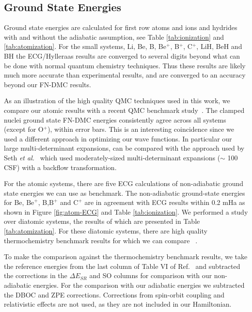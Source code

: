 \documentclass[pra,superscriptaddress,groupedaddress,twocolumn]{revtex4}
\begin{document}
\subsection{Ground State Energies}

Ground state energies are calculated for first row atoms and ions and hydrides with and without the adiabatic assumption, see Table \ref{tab:ionization} and \ref{tab:atomization}. For the small systems, Li, Be, B, Be$^+$, B$^+$, C$^+$, LiH, BeH and BH the ECG/Hylleraas results are converged to several digits beyond what can be done with normal quantum chemistry techniques. Thus these results are likely much more accurate than experimental results, and are converged to an accuracy beyond our FN-DMC results.

As an illustration of the high quality QMC techniques used in this work, we compare our atomic results with a recent QMC benchmark study~\cite{Seth_Bench}. The clamped nuclei ground state FN-DMC energies consistently agree across all systems (except for O$^{+}$), within error bars. This is an interesting coincidence since we used a different approach in optimizing our wave functions. In particular our large multi-determinant expansions, can be compared with the approach used by Seth {\it et al.}~\cite{Seth_Bench} which used moderately-sized multi-determinant expansions ($\sim$ 100 CSF) with a backflow transformation.   
 
For the atomic systems, there are five ECG calculations of non-adiabatic ground state energies we can use as benchmark. The non-adiabatic ground-state energies for Be, $\text{Be}^+$, B,$\text{B}^+$ and $\text{C}^+$ are in agreement with ECG results within 0.2 mHa as shown in Figure \ref{fig:atom-ECG} and Table \ref{tab:ionization}. We performed a study over diatomic systems, the results of which are presented in Table \ref{tab:atomization}. For these diatomic systems, there are high quality thermochemistry benchmark results for which we can compare ~\cite{Feller_Corrections}. 

To make the comparison against the thermochemistry benchmark results, we take the reference energies from the last column of Table VI of Ref.~\cite{Feller_Corrections} and subtracted the corrections in the $\Delta E_{SR}$ and SO columns for comparison with our non-adiabatic energies.  For the comparison with our adiabatic energies we subtracted the DBOC and ZPE corrections.  Corrections from spin-orbit coupling and relativistic effects are not used, as they are not included in our Hamiltonian.
\end{document}
